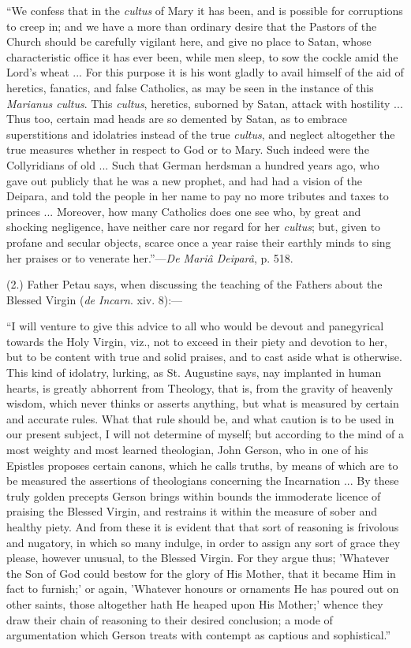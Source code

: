 ``We confess that in the \emph{cultus} of Mary it has been, and is
possible for corruptions to creep in; and we have a more than ordinary
desire that the Pastors of the Church should be carefully vigilant here,
and give no place to Satan, whose characteristic office it has ever
been, while men sleep, to sow the cockle amid the Lord's wheat ... For
this purpose it is his wont gladly to avail himself of the aid of
heretics, fanatics, and false Catholics, as may be seen in the instance
of this \emph{Marianus cultus}. This \emph{cultus}, heretics, suborned
by Satan, attack with hostility ... Thus too, certain mad heads are so
demented by Satan, as to embrace superstitions and idolatries instead of
the true \emph{cultus}, and neglect altogether the true measures whether
in respect to God or to Mary. Such indeed were the Collyridians of old
... Such that German herdsman a hundred years ago, who gave out publicly
that he was a new prophet, and had had a vision of the Deipara, and told
the people in her name to pay no more tributes and taxes to princes ...
Moreover, how many Catholics does one see who, by great and shocking
negligence, have neither care nor regard for her \emph{cultus}; but,
given to profane and secular objects, scarce once a year raise their
earthly minds to sing her praises or to venerate her.''—\emph{De
Mariâ Deiparâ}, p. 518.

(2.) Father Petau says, when discussing the teaching of the Fathers
about the Blessed Virgin (\emph{de Incarn}. xiv. 8):— 

``I will venture to give this advice to all who would be devout and
panegyrical towards the Holy Virgin, viz., not to exceed in their piety
and devotion to her, but to be content with true and solid praises, and
to cast aside what is otherwise. This kind of idolatry, lurking, as St.
Augustine says, nay implanted in human hearts, is greatly abhorrent from
Theology, that is, from the gravity of heavenly wisdom, which never
thinks or asserts anything, but what is measured by certain and accurate
rules. What that rule should be, and what caution is to be used in our
present subject, I will not determine of myself; but according to the
mind of a most weighty and most learned theologian, John Gerson, who in
one of his Epistles proposes certain canons, which he calls truths, by
means of which are to be measured the assertions of theologians
concerning the Incarnation ... By these truly golden precepts Gerson
brings within bounds the immoderate licence of praising the Blessed
Virgin, and restrains it within the measure of sober and healthy piety.
And from these it is evident that that sort of reasoning is frivolous
and nugatory, in which so many indulge, in order to assign any sort of
grace they please, however unusual, to the Blessed Virgin. For they
argue thus; 'Whatever the Son of God could bestow for the glory of His
Mother, that it became Him in fact to furnish;' or again, 'Whatever
honours or ornaments He has poured out on other saints, those altogether
hath He heaped upon His Mother;' whence they draw their chain of
reasoning to their desired conclusion; a mode of argumentation which
Gerson treats with contempt as captious and sophistical.''

